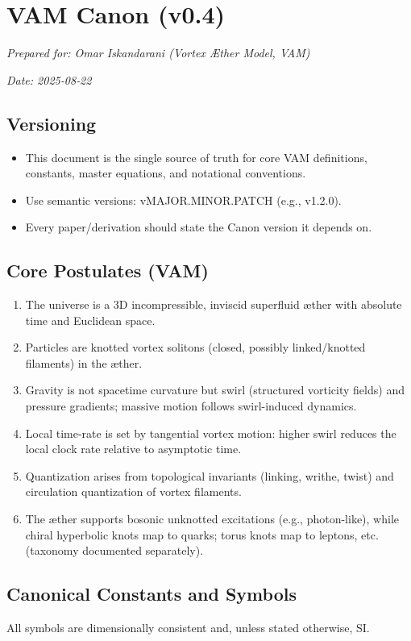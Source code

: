 \documentclass[11pt, a4paper]{article}
\begin{document}
\chapter*{VAM Canon (v0.4)}

\textit{Prepared for: Omar Iskandarani (Vortex Æther Model, VAM)}

\textit{Date: 2025‑08‑22}

\section{Versioning}
\begin{itemize}
    \item This document is the single source of truth for core VAM definitions, constants, master equations, and notational conventions.
    \item Use semantic versions: vMAJOR.MINOR.PATCH (e.g., v1.2.0).
    \item Every paper/derivation should state the Canon version it depends on.
\end{itemize}


\section{Core Postulates (VAM)}
\begin{enumerate}
    \item The universe is a 3D incompressible, inviscid superfluid æther with absolute time and Euclidean space.
    \item Particles are knotted vortex solitons (closed, possibly linked/knotted filaments) in the æther.
    \item Gravity is not spacetime curvature but swirl (structured vorticity fields) and pressure gradients; massive motion follows swirl-induced dynamics.
    \item Local time-rate is set by tangential vortex motion: higher swirl reduces the local clock rate relative to asymptotic time.
    \item Quantization arises from topological invariants (linking, writhe, twist) and circulation quantization of vortex filaments.
    \item The æther supports bosonic unknotted excitations (e.g., photon-like), while chiral hyperbolic knots map to quarks; torus knots map to leptons, etc. (taxonomy documented separately).
\end{enumerate}

\section{Canonical Constants and Symbols}
All symbols are dimensionally consistent and, unless stated otherwise, SI.
\end{document}

